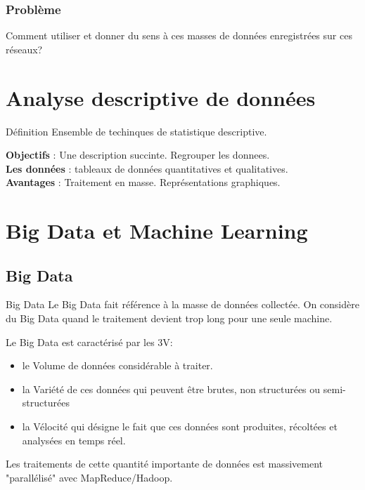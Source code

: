 	\begin{frame}
	\frametitle{Problème}
		Comment utiliser et donner du sens à ces masses de données enregistrées sur ces réseaux?
	\end{frame}
	
	\section{Analyse descriptive de données}
	\begin{frame}
		\begin{block}{Définition}
		Ensemble de techinques de statistique descriptive.
		\end{block}
		\pause
		\textbf{Objectifs} : Une description succinte. Regrouper les donnees. \\
		\pause
		\textbf{Les données} : tableaux de données quantitatives et qualitatives. \\
		\pause
		\textbf{Avantages} : Traitement en masse. Représentations graphiques.
	\end{frame}
	
	\section{Big Data et Machine Learning}
	\subsection{Big Data}
	\begin{frame}
	\begin{block}{Big Data}
	Le Big Data fait référence à la masse de données collectée.
	On considère du Big Data quand le traitement devient trop long pour une seule machine.
	\end{block}
			
		Le Big Data est caractérisé par les  3V: 
		\begin{itemize}
			\item le Volume de données considérable à traiter.
			\item la Variété de ces données qui peuvent être brutes, non structurées ou semi-structurées
			\item la Vélocité qui désigne le fait que ces données sont produites, récoltées et analysées en temps réel.
		\end{itemize}
	Les traitements de cette quantité importante de données est massivement "parallélisé" avec MapReduce/Hadoop. 
		
	\end{frame}
